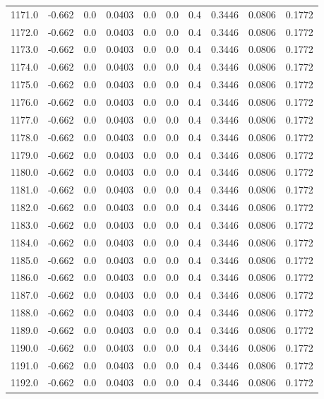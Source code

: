 \begin{longtable}{lrrrrrrrrr}
1171.0 & -0.662 & 0.0 & 0.0403 & 0.0 & 0.0 & 0.4 & 0.3446 & 0.0806 & 0.1772 \\
1172.0 & -0.662 & 0.0 & 0.0403 & 0.0 & 0.0 & 0.4 & 0.3446 & 0.0806 & 0.1772 \\
1173.0 & -0.662 & 0.0 & 0.0403 & 0.0 & 0.0 & 0.4 & 0.3446 & 0.0806 & 0.1772 \\
1174.0 & -0.662 & 0.0 & 0.0403 & 0.0 & 0.0 & 0.4 & 0.3446 & 0.0806 & 0.1772 \\
1175.0 & -0.662 & 0.0 & 0.0403 & 0.0 & 0.0 & 0.4 & 0.3446 & 0.0806 & 0.1772 \\
1176.0 & -0.662 & 0.0 & 0.0403 & 0.0 & 0.0 & 0.4 & 0.3446 & 0.0806 & 0.1772 \\
1177.0 & -0.662 & 0.0 & 0.0403 & 0.0 & 0.0 & 0.4 & 0.3446 & 0.0806 & 0.1772 \\
1178.0 & -0.662 & 0.0 & 0.0403 & 0.0 & 0.0 & 0.4 & 0.3446 & 0.0806 & 0.1772 \\
1179.0 & -0.662 & 0.0 & 0.0403 & 0.0 & 0.0 & 0.4 & 0.3446 & 0.0806 & 0.1772 \\
1180.0 & -0.662 & 0.0 & 0.0403 & 0.0 & 0.0 & 0.4 & 0.3446 & 0.0806 & 0.1772 \\
1181.0 & -0.662 & 0.0 & 0.0403 & 0.0 & 0.0 & 0.4 & 0.3446 & 0.0806 & 0.1772 \\
1182.0 & -0.662 & 0.0 & 0.0403 & 0.0 & 0.0 & 0.4 & 0.3446 & 0.0806 & 0.1772 \\
1183.0 & -0.662 & 0.0 & 0.0403 & 0.0 & 0.0 & 0.4 & 0.3446 & 0.0806 & 0.1772 \\
1184.0 & -0.662 & 0.0 & 0.0403 & 0.0 & 0.0 & 0.4 & 0.3446 & 0.0806 & 0.1772 \\
1185.0 & -0.662 & 0.0 & 0.0403 & 0.0 & 0.0 & 0.4 & 0.3446 & 0.0806 & 0.1772 \\
1186.0 & -0.662 & 0.0 & 0.0403 & 0.0 & 0.0 & 0.4 & 0.3446 & 0.0806 & 0.1772 \\
1187.0 & -0.662 & 0.0 & 0.0403 & 0.0 & 0.0 & 0.4 & 0.3446 & 0.0806 & 0.1772 \\
1188.0 & -0.662 & 0.0 & 0.0403 & 0.0 & 0.0 & 0.4 & 0.3446 & 0.0806 & 0.1772 \\
1189.0 & -0.662 & 0.0 & 0.0403 & 0.0 & 0.0 & 0.4 & 0.3446 & 0.0806 & 0.1772 \\
1190.0 & -0.662 & 0.0 & 0.0403 & 0.0 & 0.0 & 0.4 & 0.3446 & 0.0806 & 0.1772 \\
1191.0 & -0.662 & 0.0 & 0.0403 & 0.0 & 0.0 & 0.4 & 0.3446 & 0.0806 & 0.1772 \\
1192.0 & -0.662 & 0.0 & 0.0403 & 0.0 & 0.0 & 0.4 & 0.3446 & 0.0806 & 0.1772 \\

\end{longtable}
